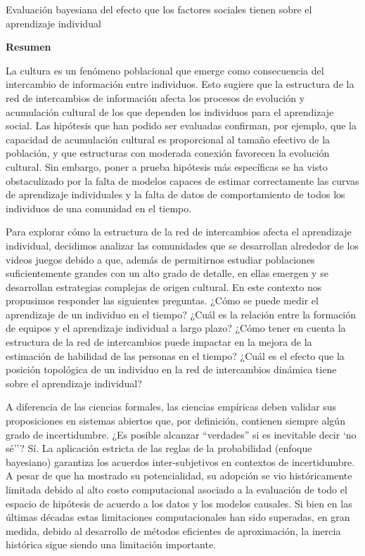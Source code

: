 \documentclass[a4paper,10pt]{book}
\theoremstyle{definition}
\newcommand{\TITULO}[0]{Evaluaci\'on bayesiana del efecto que los factores sociales tienen sobre el aprendizaje individual}
\begin{document}
\newpage

\begin{center}
\Large \TITULO \normalsize
\end{center}

\hspace{2cm}

\begin{center}
\textbf{Resumen}
\end{center}

La cultura es un fen\'omeno poblacional que emerge como consecuencia del intercambio de informaci\'on entre individuos.
Esto sugiere que la estructura de la red de intercambios de informaci\'on afecta los procesos de evoluci\'on y acumulaci\'on cultural de los que dependen los individuos para el aprendizaje social.
Las hip\'otesis que han podido ser evaluadas confirman, por ejemplo, que la capacidad de acumulaci\'on cultural es proporcional al tamaño efectivo de la poblaci\'on, y que estructuras con moderada conexi\'on favorecen la evoluci\'on cultural.
Sin embargo, poner a prueba hip\'otesis más espec\'ificas se ha visto obstaculizado por la falta de modelos capaces de estimar correctamente las curvas de aprendizaje individuales y la falta de datos de comportamiento de todos los individuos de una comunidad en el tiempo.

Para explorar c\'omo la estructura de la red de intercambios afecta el aprendizaje individual, decidimos analizar las comunidades que se desarrollan alrededor de los videos juegos debido a que, además de permitirnos estudiar poblaciones suficientemente grandes con un alto grado de detalle, en ellas emergen y se desarrollan estrategias complejas de origen cultural.
En este contexto nos propusimos responder las siguientes preguntas.
¿C\'omo se puede medir el aprendizaje de un individuo en el tiempo?
¿Cu\'al es la relaci\'on entre la formaci\'on de equipos y el aprendizaje individual a largo plazo?
¿C\'omo tener en cuenta la estructura de la red de intercambios puede impactar en la mejora de la estimaci\'on de habilidad de las personas en el tiempo?
¿Cu\'al es el efecto que la posici\'on topol\'ogica de un individuo en la red de intercambios dinámica tiene sobre el aprendizaje individual?

A diferencia de las ciencias formales, las ciencias emp\'iricas deben validar sus proposiciones en sistemas abiertos que, por definici\'on, contienen siempre algún grado de incertidumbre.
¿Es posible alcanzar ``verdades'' si es inevitable decir `no sé''?
S\'i.
La aplicaci\'on estricta de las reglas de la probabilidad (enfoque bayesiano) garantiza los acuerdos inter-subjetivos en contextos de incertidumbre.
A pesar de que ha mostrado su potencialidad, su adopci\'on se vio hist\'oricamente limitada debido al alto costo computacional asociado a la evaluaci\'on de todo el espacio de hip\'otesis de acuerdo a los datos y los modelos causales.
Si bien en las últimas décadas estas limitaciones computacionales han sido superadas, en gran medida, debido al desarrollo de métodos eficientes de aproximaci\'on, la inercia hist\'orica sigue siendo una limitaci\'on importante.
\end{document}
